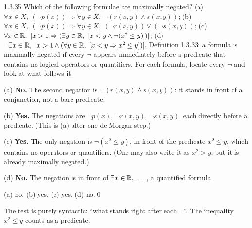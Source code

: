 \begin{bookex}[recommended]{1.3.35}
Which of the following formulae are maximally negated? (a) $\forall x\in X,\ (\neg p(x))\Rightarrow\forall y\in X,\ \neg(r(x,y)\wedge s(x,y))$; (b) $\forall x\in X,\ (\neg p(x))\Rightarrow\forall y\in X,\ (\neg r(x,y))\vee(\neg s(x,y))$; (c) $\forall x\in\R,\ [x>1\Rightarrow(\exists y\in\R,\ [x<y\wedge\neg(x^2\le y)])]$; (d) $\neg\exists x\in\R,\ [x>1\wedge(\forall y\in\R,\ [x<y\Rightarrow x^2\le y])]$.
\solution
\given Definition 1.3.33: a formula is maximally negated if every $\neg$ appears immediately before a predicate that contains no logical operators or quantifiers.
\plan For each formula, locate every $\neg$ and look at what follows it.
\begin{steps}
\item (a) \textbf{No.} The second negation is $\neg(r(x,y)\wedge s(x,y))$: it stands in front of a conjunction, not a bare predicate.
\item (b) \textbf{Yes.} The negations are $\neg p(x)$, $\neg r(x,y)$, $\neg s(x,y)$, each directly before a predicate. (This is (a) after one de Morgan step.)
\item (c) \textbf{Yes.} The only negation is $\neg(x^2\le y)$, in front of the predicate $x^2\le y$, which contains no operators or quantifiers. (One may also write it as $x^2>y$, but it is already maximally negated.)
\item (d) \textbf{No.} The negation is in front of $\exists x\in\mathbb{R},\ \dots$, a quantified formula.
\end{steps}
\conclusion (a) no, (b) yes, (c) yes, (d) no.\qed
\begin{compare}
\item The test is purely syntactic: ``what stands right after each $\neg$''. The inequality $x^2\le y$ counts as a predicate.
\end{compare}
\end{bookex}

